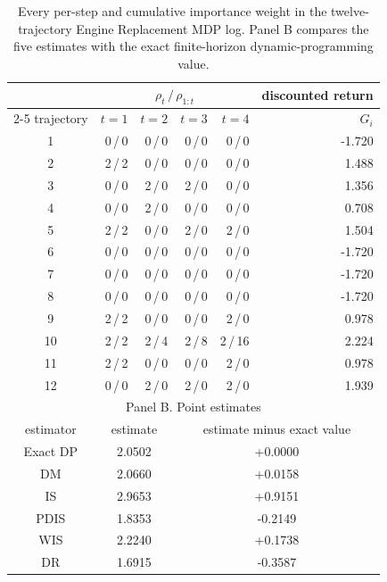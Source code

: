 \begin{table}[H]
\centering
\caption{Every per-step and cumulative importance weight in the twelve-trajectory Engine Replacement MDP log. Panel B compares the five estimates with the exact finite-horizon dynamic-programming value.}
\label{tab:engine_ope}
{\scriptsize\renewcommand{\arraystretch}{1.05}
\begin{tabular}{crrrrr}
\toprule
& \multicolumn{4}{c}{$\rho_t\,/\,\rho_{1:t}$} & discounted return \\
\cmidrule(lr){2-5}
trajectory & $t=1$ & $t=2$ & $t=3$ & $t=4$ & $G_i$ \\
\midrule
1 & 0\,/\,0 & 0\,/\,0 & 0\,/\,0 & 0\,/\,0 & -1.720 \\
2 & 2\,/\,2 & 0\,/\,0 & 0\,/\,0 & 0\,/\,0 & 1.488 \\
3 & 0\,/\,0 & 2\,/\,0 & 2\,/\,0 & 0\,/\,0 & 1.356 \\
4 & 0\,/\,0 & 2\,/\,0 & 0\,/\,0 & 0\,/\,0 & 0.708 \\
5 & 2\,/\,2 & 0\,/\,0 & 2\,/\,0 & 2\,/\,0 & 1.504 \\
6 & 0\,/\,0 & 0\,/\,0 & 0\,/\,0 & 0\,/\,0 & -1.720 \\
7 & 0\,/\,0 & 0\,/\,0 & 0\,/\,0 & 0\,/\,0 & -1.720 \\
8 & 0\,/\,0 & 0\,/\,0 & 0\,/\,0 & 0\,/\,0 & -1.720 \\
9 & 2\,/\,2 & 0\,/\,0 & 0\,/\,0 & 2\,/\,0 & 0.978 \\
10 & 2\,/\,2 & 2\,/\,4 & 2\,/\,8 & 2\,/\,16 & 2.224 \\
11 & 2\,/\,2 & 0\,/\,0 & 0\,/\,0 & 2\,/\,0 & 0.978 \\
12 & 0\,/\,0 & 2\,/\,0 & 2\,/\,0 & 2\,/\,0 & 1.939 \\
\midrule
\multicolumn{6}{c}{Panel B. Point estimates} \\
\midrule
estimator & \multicolumn{2}{c}{estimate} & \multicolumn{3}{c}{estimate minus exact value} \\
Exact DP & \multicolumn{2}{c}{2.0502} & \multicolumn{3}{c}{+0.0000} \\
DM & \multicolumn{2}{c}{2.0660} & \multicolumn{3}{c}{+0.0158} \\
IS & \multicolumn{2}{c}{2.9653} & \multicolumn{3}{c}{+0.9151} \\
PDIS & \multicolumn{2}{c}{1.8353} & \multicolumn{3}{c}{-0.2149} \\
WIS & \multicolumn{2}{c}{2.2240} & \multicolumn{3}{c}{+0.1738} \\
DR & \multicolumn{2}{c}{1.6915} & \multicolumn{3}{c}{-0.3587} \\
\bottomrule
\end{tabular}}
\end{table}
